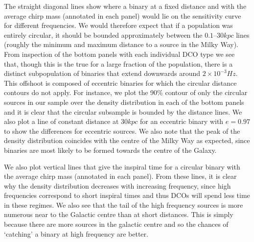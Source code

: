 The straight diagonal lines show where a binary at a fixed distance and with the average chirp mass (annotated in each panel) would lie on the sensitivity curve for different frequencies. We would therefore expect that if a population was entirely circular, it should be bounded approximately between the $0.1$--$30 \unit{kpc}$ lines (roughly the minimum and maximum distance to a source in the Milky Way). From inspection of the bottom panels with each individual DCO type we see that, though this is the true for a large fraction of the population, there is a distinct subpopulation of binaries that extend downwards around $2 \times 10^{-3} \unit{Hz}$. This offshoot is composed of eccentric binaries for which the circular distance contours do not apply. For instance, we plot the 90\% contour of only the circular sources in our sample over the density distribution in each of the bottom panels and it is clear that the circular subsample is bounded by the distance lines. We also plot a line of constant distance at $30 \unit{kpc}$ for an eccentric binary with $e = 0.97$ to show the differences for eccentric sources. We also note that the peak of the density distribution coincides with the centre of the Milky Way as expected, since binaries are most likely to be formed towards the centre of the Galaxy.

We also plot vertical lines that give the inspiral time for a circular binary with the average chirp mass (annotated in each panel). From these lines, it is clear why the density distribution decreases with increasing frequency, since high frequencies correspond to short inspiral times and thus DCOs will spend less time in these regimes. We also see that the tail of the high frequency sources is more numerous near to the Galactic centre than at short distances. This is simply because there are more sources in the galactic centre and so the chances of `catching' a binary at high frequency are better.

